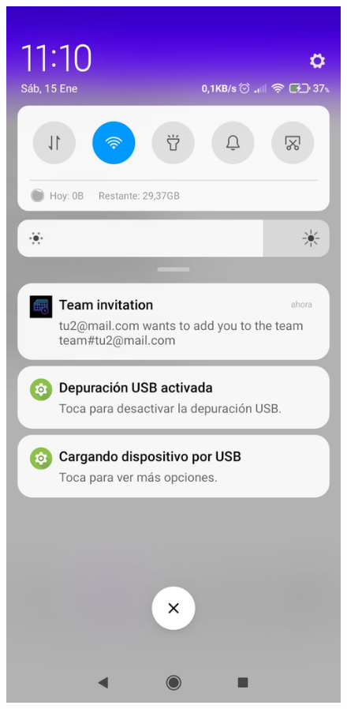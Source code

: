 \documentclass[a4paper,openright,12pt]{article}
\begin{document}
\begin{figure}
    \includegraphics[scale=0.05]{notif_add_team.jpeg}\hfill

\end{figure}
\end{document}
